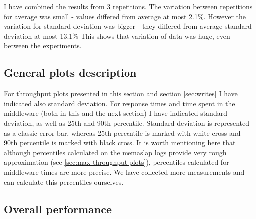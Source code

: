 \documentclass[11pt]{article}
\begin{document}
I have combined the results from 3 repetitions. The variation between repetitions for average was small - values differed from average at most 2.1\%. However the variation for standard deviation was bigger - they differed from average standard deviation at most 13.1\%  This shows that variation of data was huge, even between the experiments.

\subsection{General plots description}
For throughput plots presented in this section and section \ref{sec:writes} I have indicated also standard deviation. For response times and time spent in the middleware (both in this and the next section) I have indicated standard deviation, as well as 25th and 90th percentile. Standard deviation is represented as a classic error bar, whereas 25th percentile is marked with white cross and 90th percentile is marked with black cross. It is worth mentioning here that although percentiles calculated on the memaslap logs provide very rough approximation (see \ref{sec:max-throughput-plots}), percentiles calculated for middleware times are more precise. We have collected more measurements and can calculate this percentiles ourselves. 

\subsection{Overall performance}
\label{sec:replication-overall}
\end{document}
